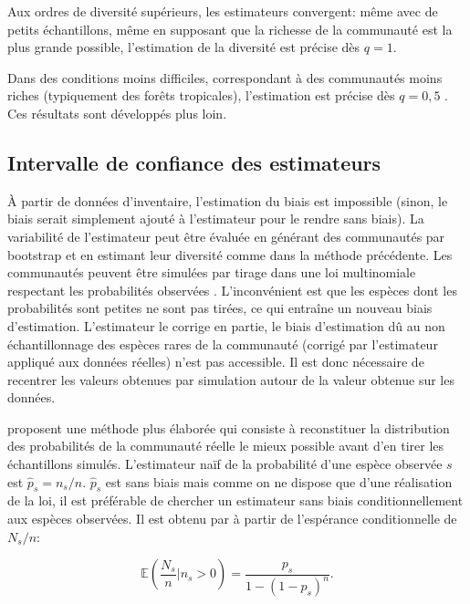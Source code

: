 \documentclass[
  11pt,
  french,
  a4paper,
  extrafontsizes,onecolumn,openright
  ]{memoir}
\begin{document}
Aux ordres de diversité supérieurs, les estimateurs convergent: même avec de petits échantillons, même en supposant que la richesse de la communauté est la plus grande possible, l'estimation de la diversité est précise dès \(q=1\).

Dans des conditions moins difficiles, correspondant à des communautés moins riches (typiquement des forêts tropicales), l'estimation est précise dès \(q=0,5\) \autocite{Marcon2015a}.
Ces résultats sont développés plus loin.

\subsection{Intervalle de confiance des estimateurs}\label{intervalle-de-confiance-des-estimateurs}

À partir de données d'inventaire, l'estimation du biais est impossible (sinon, le biais serait simplement ajouté à l'estimateur pour le rendre sans biais).
La variabilité de l'estimateur peut être évaluée en générant des communautés par bootstrap et en estimant leur diversité comme dans la méthode précédente.
Les communautés peuvent être simulées par tirage dans une loi multinomiale respectant les probabilités observées \autocite{Marcon2012a,Marcon2014a}.
L'inconvénient est que les espèces dont les probabilités sont petites ne sont pas tirées, ce qui entraîne un nouveau biais d'estimation.
L'estimateur le corrige en partie, le biais d'estimation dû au non échantillonnage des espèces rares de la communauté (corrigé par l'estimateur appliqué aux données réelles) n'est pas accessible.
Il est donc nécessaire de recentrer les valeurs obtenues par simulation autour de la valeur obtenue sur les données.

\textcite{Chao2015} proposent une méthode plus élaborée qui consiste à reconstituer la distribution des probabilités de la communauté réelle le mieux possible avant d'en tirer les échantillons simulés.
L'estimateur naïf de la probabilité d'une espèce observée \(s\) est \(\hat{p}_s = {n_s}/{n}\).
\(\hat{p}_s\) est sans biais mais comme on ne dispose que d'une réalisation de la loi, il est préférable de chercher un estimateur sans biais conditionnellement aux espèces observées.
Il est obtenu par \textcite{Chao2013} à partir de l'espérance conditionnelle de \({N_s}/{n}\):

\begin{equation}
  \label{eq:Chao2013ENs}
  {\mathbb E} \left( \frac{N_s}{n} | n_s>0 \right)
  = \frac{p_s}{1-(1-p_s)^n}.
\end{equation}
\end{document}
